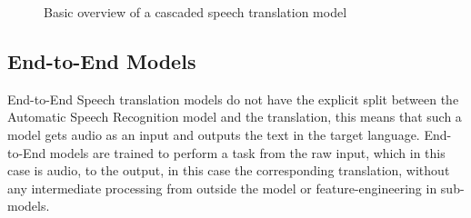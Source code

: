 \begin{figure}
    \centering
    

\label{fig:cascaded model}
\caption{Basic overview of a cascaded speech translation model}
\end{figure}
\subsection{End-to-End Models}
End-to-End Speech translation models do not have the explicit split between the Automatic Speech Recognition model and the translation, this means that such a model gets audio as an input and outputs the text in the target language. 
End-to-End models are trained to perform a task from the raw input, which in this case is audio, to the output, in this case the corresponding translation, without any intermediate processing from outside the model or feature-engineering in sub-models. 
